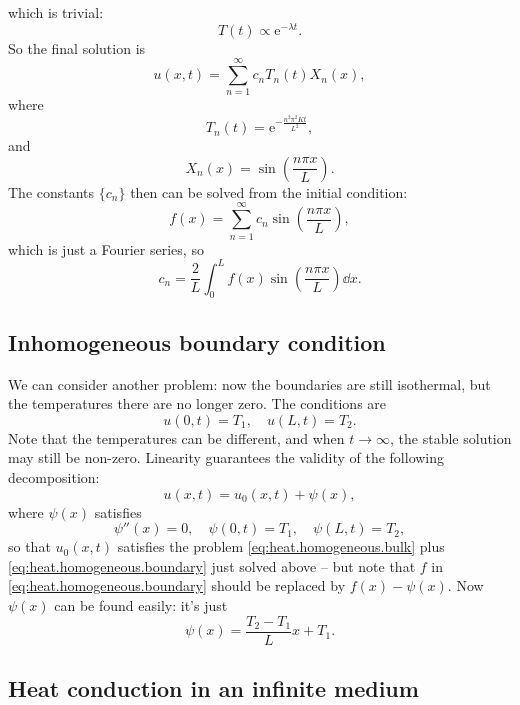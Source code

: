 \documentclass[hyperref, a4paper]{article}
\newcommand*{\ee}{\mathrm{e}}
\begin{document}
which is trivial: 
\[
    T(t) \propto \ee^{- \lambda t}.
\]
So the final solution is 
\begin{equation}
    u(x, t) = \sum_{n=1}^{\infty} 
        c_n T_n(t) X_n(x), 
\end{equation}
where 
\begin{equation}
    T_n(t) = \ee^{- \frac{n^2 \pi^2 K t}{L^2}}, 
\end{equation}
and 
\begin{equation}
    X_n(x) = \sin(\frac{n \pi x}{L}).
\end{equation}
The constants $\{c_n\}$ then can be solved from the initial condition: 
\[
    f(x) = \sum_{n=1}^{\infty} c_n \sin (\frac{n \pi x}{L}) ,
\]
which is just a Fourier series, so 
\begin{equation}
    c_n = \frac{2}{L} \int_{0}^{L} f(x) \sin (\frac{n \pi x}{L}) \dd{x}.
\end{equation}

\subsection{Inhomogeneous boundary condition}

We can consider another problem: 
now the boundaries are still isothermal, 
but the temperatures there are no longer zero.
The conditions are 
\begin{equation}
    u(0, t) = T_1, \quad 
    u(L, t) = T_2.
\end{equation}
Note that the temperatures can be different, 
and when $t \to \infty$, the stable solution may still be non-zero. 
Linearity guarantees the validity of the following decomposition:
\begin{equation}
    u(x, t) = u_0(x, t) + \psi(x),
\end{equation}
where $\psi(x)$ satisfies 
\begin{equation}
    \psi''(x) = 0, \quad 
    \psi(0, t) = T_1, \quad 
    \psi(L, t) = T_2,
\end{equation}
so that $u_0(x, t)$ satisfies 
the problem \eqref{eq:heat.homogeneous.bulk} plus \eqref{eq:heat.homogeneous.boundary} 
just solved above -- 
but note that $f$ in \eqref{eq:heat.homogeneous.boundary}
should be replaced by $f(x) - \psi(x)$.
Now $\psi(x)$ can be found easily: 
it's just 
\begin{equation}
    \psi(x) = \frac{T_2 - T_1}{L} x + T_1.
\end{equation}

\subsection{Heat conduction in an infinite medium}
\end{document}
